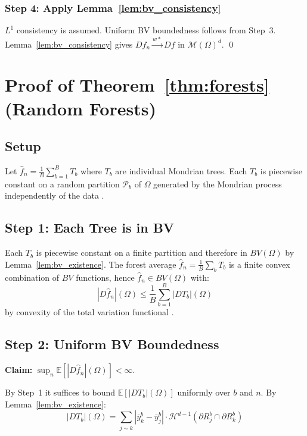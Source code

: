 \documentclass[12pt]{article}
\newcommand{\E}{\mathbb{E}}
\newcommand{\BV}{BV(\Omega)}
\newcommand{\cM}{\mathcal{M}(\Omega)^d}
\newcommand{\fn}{\hat{f}_n}
\begin{document}
	\subsubsection*{Step 4: Apply Lemma~\ref{lem:bv_consistency}}
	
	$L^1$ consistency is assumed. Uniform BV boundedness follows from Step~3.
	Lemma~\ref{lem:bv_consistency} gives $D\fn \xrightarrow{w*} Df$ in $\cM$.
	\qed
	
	\section{Proof of Theorem~\ref{thm:forests} (Random Forests)}
	\label{app:forests}
	
	\subsection{Setup}
	
	Let $\fn = \frac{1}{B}\sum_{b=1}^B T_b$ where $T_b$ are individual Mondrian
	trees. Each $T_b$ is piecewise constant on a random partition $\mathcal{P}_b$
	of $\Omega$ generated by the Mondrian process independently of the data
	\citep[see][]{lakshminarayanan2014mondrian}.
	
	\subsection{Step 1: Each Tree is in BV}
	
	Each $T_b$ is piecewise constant on a finite partition and therefore in
	$\BV$ by Lemma~\ref{lem:bv_existence}. The forest average $\fn =
	\frac{1}{B}\sum_b T_b$ is a finite convex combination of $BV$ functions,
	hence $\fn \in \BV$ with:
	\begin{equation}
		|D\fn|(\Omega) \leq \frac{1}{B} \sum_{b=1}^B |DT_b|(\Omega)
	\end{equation}
	by convexity of the total variation functional
	\citep[Proposition~3.6]{ambrosio2000bv}.
	
	\subsection{Step 2: Uniform BV Boundedness}
	
	\textbf{Claim:} $\sup_n \E[|D\fn|(\Omega)] < \infty$.
	
	By Step~1 it suffices to bound $\E[|DT_b|(\Omega)]$ uniformly over $b$
	and $n$. By Lemma~\ref{lem:bv_existence}:
	\begin{equation}
		|DT_b|(\Omega) =
		\sum_{j \sim k} |\bar{y}_k^b - \bar{y}_j^b| \cdot
		\mathcal{H}^{d-1}(\partial R_j^b \cap \partial R_k^b)
	\end{equation}
	
\end{document}
